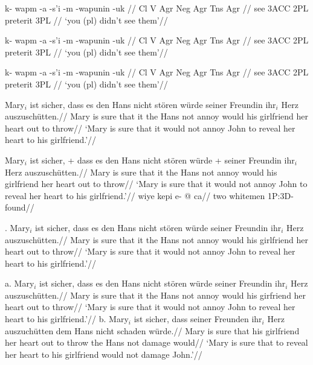 \ex
\framewords
\begingl
\gla k- wapm -a -s'i -m -wapunin -uk //
\glb Cl V Agr Neg Agr Tns Agr //
 see {3\sc ACC} {} 2{\sc PL} preterit 3{\sc PL} //
\glft `you (pl) didn't see them'//
\endgl
\xe

\ex
\begingl
\gla[everygla=] k- wapm -a -s'i -m -wapunin -uk //
\glb[everyglb=\tenrm,aboveglbskip=-.5ex] Cl V Agr Neg Agr Tns Agr //
 see {3\sc ACC} {} 2{\sc PL} preterit 3{\sc PL} //
\glft `you (pl) didn't see them'//
\endgl
\xe


\ex[lingstyle=Potawatomi]
\begingl
\gla k- wapm -a -s'i -m -wapunin -uk //
\glcat Cl V Agr Neg Agr Tns Agr //
 see {3\sc ACC} {} 2{\sc PL} preterit 3{\sc PL} //
\glft `you (pl) didn't see them'//
\endgl
\xe

\ex
\begingl
\gla Mary$_i$ ist sicher, dass es den Hans nicht st\"oren w\"urde
seiner Freundin ihr$_i$ Herz auszusch\"utten.//
\glb Mary is sure that it the Hans not annoy would
his girlfriend her heart {out to
throw}//
\glft  `Mary is sure that it would not annoy John to reveal her
heart to his girlfriend.'//
\endgl
\xe

\def\glexample{\the\excnt}
\ex
\begingl
\gla Mary$_i$ ist sicher, + dass es den Hans nicht st\"oren w\"urde
+ seiner Freundin ihr$_i$ Herz auszusch\"utten.//
\glb Mary is sure that it the Hans not annoy would
his girlfriend her heart {out to
throw}//
\glft  `Mary is sure that it would not annoy John to reveal her
heart to his girlfriend.'//
\endgl
\xe
\ex
\begingl
\gla wiye kepi e- @ ca//
\glb two whitemen \sc1P:3D- found//
\endgl
\xe

\exdisplay
{}.\quad
\gla Mary$_i$ ist sicher, dass es den Hans nicht st\"oren w\"urde
seiner Freundin ihr$_i$ Herz auszusch\"utten.//
\glb Mary is sure that it the Hans not annoy would
his girlfriend her heart
{out to throw}//
\glft  `Mary is sure that it would not annoy John to reveal her
heart to his girlfriend.'//
\endgl
\xe

\ex
a.\quad
\begingl[glwidth=2.6in]
\gla Mary$_i$ ist sicher, dass es den Hans nicht st\"oren w\"urde
seiner Freundin ihr$_i$ Herz auszusch\"utten.//
\glb Mary is sure that it the Hans not annoy would
his girfriend her heart {out to
throw}//
\glft  `Mary is sure that it would not annoy John to reveal her
heart to his girlfriend.'//
\endgl
\hfil
b.\quad
\begingl[glwidth=2.6in]
\gla Mary$_i$ ist sicher, dass seiner Freunden ihr$_i$ Herz
auszuch\"utten dem Hans nicht schaden w\"urde.//
\glb Mary is sure that his girlfriend her
heart {out to throw} the Hans not damage would//
\glft `Mary is sure that to reveal her heart to his girlfriend
would not damage John.'//
\endgl
\xe


